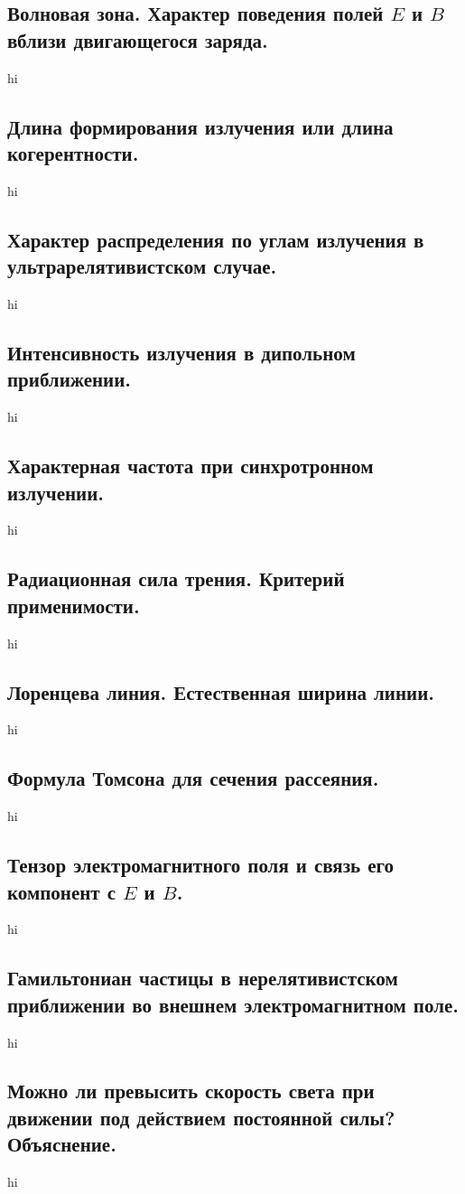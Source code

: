\documentclass[a4paper,12pt]{article}
\begin{document}
\subsection{Волновая зона. Характер поведения полей $E$ и $B$ вблизи
двигающегося заряда.}
hi
\subsection{Длина формирования излучения или длина когерентности.}
hi
\subsection{Характер распределения по углам излучения в ультрарелятивистском
случае.}
hi
\subsection{Интенсивность излучения в дипольном приближении.}
hi
\subsection{Характерная частота при синхротронном излучении.}
hi
\subsection{Радиационная сила трения. Критерий применимости.}
hi
\subsection{Лоренцева линия. Естественная ширина линии.}
hi
\subsection{Формула Томсона для сечения рассеяния.}
hi
\subsection{Тензор электромагнитного поля и связь его компонент с $E$ и $B$.}
hi
\subsection{Гамильтониан частицы в нерелятивистском приближении во внешнем
электромагнитном поле.}
hi
\subsection{Можно ли превысить скорость света при движении под действием
постоянной силы? Объяснение.}
hi
\end{document}
